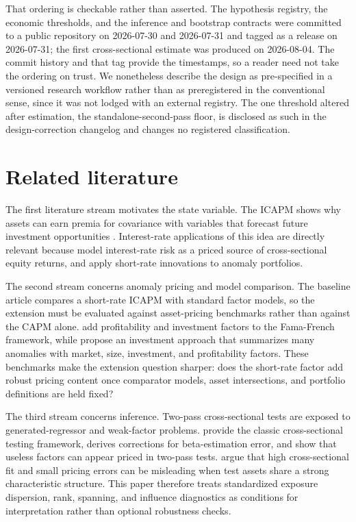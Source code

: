 \documentclass[11pt]{article}
\begin{document}
That ordering is checkable rather than asserted. The hypothesis registry, the
economic thresholds, and the inference and bootstrap contracts were committed to
a public repository on 2026-07-30 and 2026-07-31 and tagged as a release on %
2026-07-31; the first cross-sectional estimate was produced on 2026-08-04. The %
commit history and that tag provide the timestamps, so a reader need not take the
ordering on trust. We nonetheless describe the design as pre-specified in a
versioned research workflow rather than as preregistered in the conventional
sense, since it was not lodged with an external registry. The one threshold
altered after estimation, the standalone-second-pass floor, is disclosed as such
in the design-correction changelog and changes no registered classification. %

\section{Related literature}

The first literature stream motivates the state variable. The ICAPM shows why
assets can earn premia for covariance with variables that forecast future
investment opportunities \citep{merton_1973}. Interest-rate applications of this
idea are directly relevant because \citet{lioui_maio_2014} model interest-rate
risk as a priced source of cross-sectional equity returns, and
\citet{maio_santaclara_2017} apply short-rate innovations to anomaly portfolios.

The second stream concerns anomaly pricing and model comparison. The baseline
article compares a short-rate ICAPM with standard factor models, so the extension
must be evaluated against asset-pricing benchmarks rather than against the CAPM
alone. \citet{fama_french_2015} add profitability and investment factors to the
Fama-French framework, while \citet{hou_xue_zhang_2015} propose an investment
approach that summarizes many anomalies with market, size, investment, and
profitability factors. These benchmarks make the extension question sharper:
does the short-rate factor add robust pricing content once comparator models,
asset intersections, and portfolio definitions are held fixed?

The third stream concerns inference. Two-pass cross-sectional tests are exposed
to generated-regressor and weak-factor problems. \citet{fama_macbeth_1973}
provide the classic cross-sectional testing framework, \citet{shanken_1992}
derives corrections for beta-estimation error, and \citet{kan_zhang_1999} show
that useless factors can appear priced in two-pass tests. \citet{lewellen_nagel_shanken_2010}
argue that high cross-sectional fit and small pricing errors can be misleading
when test assets share a strong characteristic structure. This paper therefore
treats standardized exposure dispersion, rank, spanning, and influence diagnostics as conditions
for interpretation rather than optional robustness checks.
\end{document}
